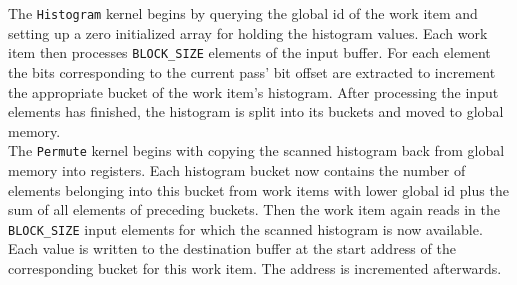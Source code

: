 

The \lstinline!Histogram! kernel begins by querying the global id of the work item and setting up a zero initialized array for holding the histogram values. Each work item then processes \lstinline!BLOCK_SIZE! elements of the input buffer. For each element the bits corresponding to the current pass' bit offset are extracted to increment the appropriate bucket of the work item's histogram. After processing the input elements has finished, the histogram is split into its buckets and moved to global memory. \\
The \lstinline!Permute! kernel begins with copying the scanned histogram back from global memory into registers. Each histogram bucket now contains the number of elements belonging into this bucket from work items with lower global id plus the sum of all elements of preceding buckets. Then the work item again reads in the \lstinline!BLOCK_SIZE! input elements for which the scanned histogram is now available. Each value is written to the destination buffer at the start address of the corresponding bucket for this work item. The address is incremented afterwards.

